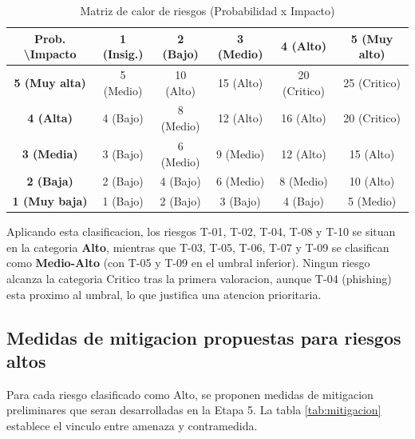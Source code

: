 \documentclass[11pt, a4paper]{article}
\begin{document}
\begin{table}[H]
\centering
\renewcommand{\arraystretch}{1.4}
\small
\begin{tabular}{|c|c|c|c|c|c|}
\hline
\textbf{Prob. \textbackslash Impacto} & \textbf{1 (Insig.)} & \textbf{2 (Bajo)} & \textbf{3 (Medio)} & \textbf{4 (Alto)} & \textbf{5 (Muy alto)} \\
\hline
\textbf{5 (Muy alta)} & 5 (Medio) & 10 (Alto) & 15 (Alto) & 20 (Critico) & 25 (Critico) \\
\hline
\textbf{4 (Alta)} & 4 (Bajo) & 8 (Medio) & 12 (Alto) & 16 (Alto) & 20 (Critico) \\
\hline
\textbf{3 (Media)} & 3 (Bajo) & 6 (Medio) & 9 (Medio) & 12 (Alto) & 15 (Alto) \\
\hline
\textbf{2 (Baja)} & 2 (Bajo) & 4 (Bajo) & 6 (Medio) & 8 (Medio) & 10 (Alto) \\
\hline
\textbf{1 (Muy baja)} & 1 (Bajo) & 2 (Bajo) & 3 (Bajo) & 4 (Bajo) & 5 (Medio) \\
\hline
\end{tabular}
\caption{Matriz de calor de riesgos (Probabilidad x Impacto)}
\label{tab:matriz-calor}
\end{table}

Aplicando esta clasificacion, los riesgos T-01, T-02, T-04, T-08 y T-10 se situan en la categoria \textbf{Alto}, mientras que T-03, T-05, T-06, T-07 y T-09 se clasifican como \textbf{Medio-Alto} (con T-05 y T-09 en el umbral inferior). Ningun riesgo alcanza la categoria Critico tras la primera valoracion, aunque T-04 (phishing) esta proximo al umbral, lo que justifica una atencion prioritaria.

\subsection{Medidas de mitigacion propuestas para riesgos altos}

Para cada riesgo clasificado como Alto, se proponen medidas de mitigacion preliminares que seran desarrolladas en la Etapa 5. La tabla \ref{tab:mitigacion} establece el vinculo entre amenaza y contramedida.
\end{document}

